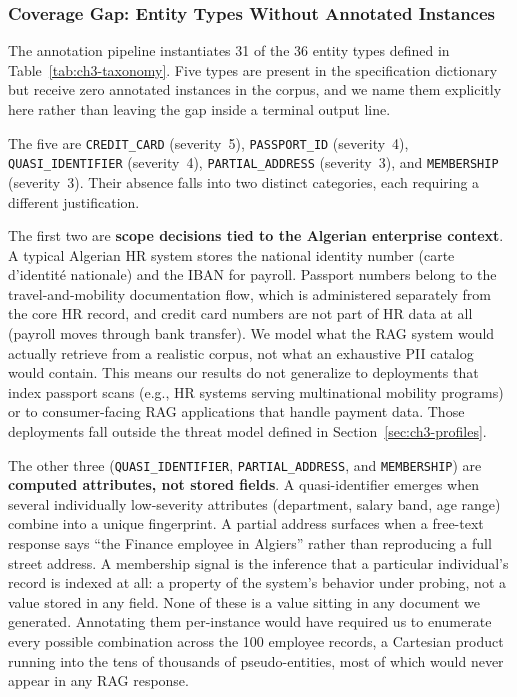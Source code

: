 \documentclass[12pt,a4paper]{report}
\begin{document}
\subsubsection{Coverage Gap: Entity Types Without Annotated Instances}
\label{ch3:subsec:coverage-gap}

The annotation pipeline instantiates 31 of the 36 entity types defined in Table~\ref{tab:ch3-taxonomy}. Five types are present in the specification dictionary but receive zero annotated instances in the corpus, and we name them explicitly here rather than leaving the gap inside a terminal output line.

The five are \texttt{CREDIT\_CARD} (severity~5), \texttt{PASSPORT\_ID} (severity~4), \texttt{QUASI\_IDENTIFIER} (severity~4), \texttt{PARTIAL\_ADDRESS} (severity~3), and \texttt{MEMBERSHIP} (severity~3). Their absence falls into two distinct categories, each requiring a different justification.

The first two are \textbf{scope decisions tied to the Algerian enterprise context}. A typical Algerian HR system stores the national identity number (carte d'identité nationale) and the IBAN for payroll. Passport numbers belong to the travel-and-mobility documentation flow, which is administered separately from the core HR record, and credit card numbers are not part of HR data at all (payroll moves through bank transfer). We model what the RAG system would actually retrieve from a realistic corpus, not what an exhaustive PII catalog would contain. This means our results do not generalize to deployments that index passport scans (e.g., HR systems serving multinational mobility programs) or to consumer-facing RAG applications that handle payment data. Those deployments fall outside the threat model defined in Section~\ref{sec:ch3-profiles}.

The other three (\texttt{QUASI\_IDENTIFIER}, \texttt{PARTIAL\_ADDRESS}, and \texttt{MEMBERSHIP}) are \textbf{computed attributes, not stored fields}. A quasi-identifier emerges when several individually low-severity attributes (department, salary band, age range) combine into a unique fingerprint. A partial address surfaces when a free-text response says ``the Finance employee in Algiers'' rather than reproducing a full street address. A membership signal is the inference that a particular individual's record is indexed at all: a property of the system's behavior under probing, not a value stored in any field. None of these is a value sitting in any document we generated. Annotating them per-instance would have required us to enumerate every possible combination across the 100 employee records, a Cartesian product running into the tens of thousands of pseudo-entities, most of which would never appear in any RAG response.
\end{document}
